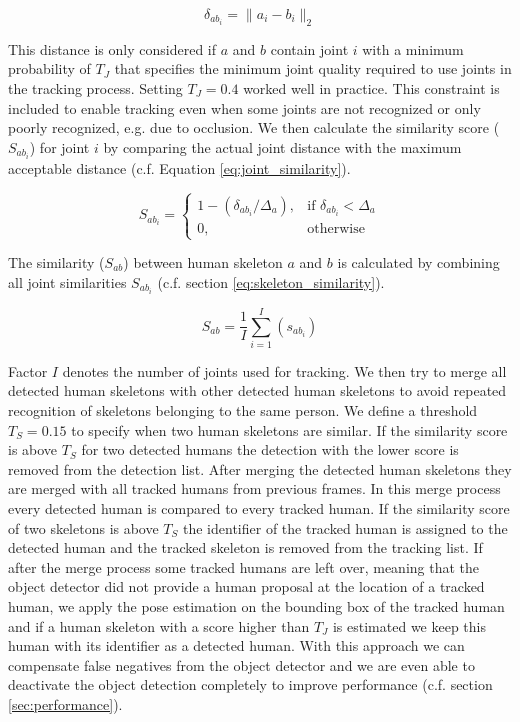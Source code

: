 \documentclass[a4paper, 10pt, conference]{ieeeconf}
\begin{document}
\begin{equation}
  \label{eq:joint_distance}
    \delta_{ab_{i}} = \rVert a_i - b_i \rVert_2
\end{equation}

This distance is only considered if $a$ and $b$ contain joint $i$ with a minimum probability of $T_J$ that specifies the minimum joint quality required to use joints in the tracking process. Setting $T_J=0.4$ worked well in practice. This constraint is included to enable tracking even when some joints are not recognized or only poorly recognized, e.g. due to occlusion. 
We then calculate the similarity score ($S_{ab_{i}}$) for joint $i$ by comparing the actual joint distance with the maximum acceptable distance (c.f. Equation \ref{eq:joint_similarity}).

\begin{equation}
  \label{eq:joint_similarity}
    S_{ab_{i}} = \begin{cases}
        1 - (\delta_{ab_{i}} / \Delta_{a}),& \text{if } \delta_{ab_{i}} < \Delta_{a}\\
        0,              & \text{otherwise}
    \end{cases}
\end{equation}

The similarity ($S_{ab}$) between human skeleton $a$ and $b$ is calculated by combining all joint similarities $S_{ab_{i}}$ (c.f. section \ref{eq:skeleton_similarity}). 

\begin{equation}
  \label{eq:skeleton_similarity}
    S_{ab} = \frac{1}{I}\sum\limits_{i=1}^I (s_{ab_{i}})
\end{equation}

Factor $I$ denotes the number of joints used for tracking. We then try to merge all detected human skeletons with other detected human skeletons to avoid repeated recognition of skeletons belonging to the same person. We define a threshold $T_S=0.15$ to specify when two human skeletons are similar. If the similarity score is above $T_S$ for two detected humans the detection with the lower score is removed from the detection list. After merging the detected human skeletons they are merged with all tracked humans from previous frames. In this merge process every detected human is compared to every tracked human. If the similarity score of two skeletons is above $T_S$ the identifier of the tracked human is assigned to the detected human and the tracked skeleton is removed from the tracking list. If after the merge process some tracked humans are left over, meaning that the object detector did not provide a human proposal at the location of a tracked human, we apply the pose estimation on the bounding box of the tracked human and if a human skeleton with a score higher than $T_J$ is estimated we keep this human with its identifier as a detected human. With this approach we can compensate false negatives from the object detector and we are even able to deactivate the object detection completely to improve performance (c.f. section \ref{sec:performance}).
\end{document}

